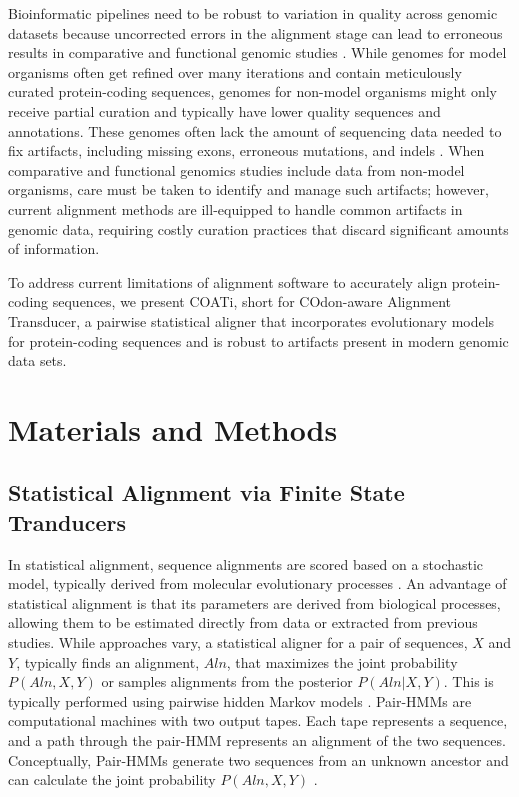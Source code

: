 \documentclass[12pt,letterpaper]{article}
\begin{document}
Bioinformatic pipelines need to be robust to variation in quality across genomic datasets because uncorrected errors in the alignment stage can lead to erroneous results in comparative and functional genomic studies \citep{estimates_schneider_2009, effect_fletcher_2010, hubisz2011error}.
While genomes for model organisms often get refined over many iterations and contain meticulously curated protein-coding sequences, 
genomes for non-model organisms might only receive partial curation and typically have lower quality sequences and annotations.
These genomes often lack the amount of sequencing data needed to fix artifacts, including missing exons, erroneous mutations, and indels \citep{jackman2018tigmint}.
%
When comparative and functional genomics studies include data from non-model organisms, care must be taken to identify and manage such artifacts; however,
current alignment methods are ill-equipped to handle common artifacts in genomic data, requiring costly curation practices that discard significant amounts of information.

To address current limitations of alignment software to accurately align protein-coding sequences, we present COATi, short for COdon-aware Alignment Transducer, a pairwise statistical aligner that incorporates evolutionary models for protein-coding sequences and is robust to artifacts present in modern genomic data sets.


\section*{Materials and Methods}

\subsection*{Statistical Alignment via Finite State Tranducers}

In statistical alignment, sequence alignments are scored based on a stochastic model, typically derived from molecular evolutionary processes \citep{Lunter2005-hk}. An advantage of statistical alignment is that its parameters are derived from biological processes, allowing them to be estimated directly from data or extracted from previous studies. While approaches vary, a statistical aligner for a pair of sequences, $X$ and $Y$, typically finds an alignment, $Aln$, that maximizes the joint probability $P(Aln, X, Y)$ or samples alignments from the posterior $P(Aln | X, Y)$. This is typically performed using pairwise hidden Markov models \citep[pair-HMMs;][]{bradley2007transducers}. Pair-HMMs are computational machines with two output tapes. Each tape represents a sequence, and a path through the pair-HMM represents an alignment of the two sequences. Conceptually, Pair-HMMs generate two sequences from an unknown ancestor and can calculate the joint probability $P(Aln, X, Y)$ \citep{yoon_2009_hmm}.
\end{document}
